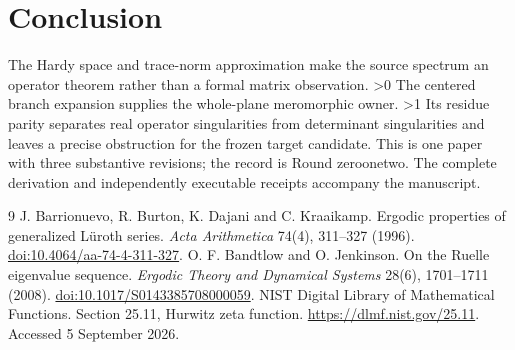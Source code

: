 \documentclass[10pt]{article}
\begin{document}
\section{Conclusion}
The Hardy space and trace-norm approximation make the source spectrum
an operator theorem rather than a formal matrix observation.
\ifnum\CRevisionRound>0
The centered branch expansion supplies the whole-plane meromorphic owner.
\fi
\ifnum\CRevisionRound>1
Its residue parity separates real operator singularities from determinant
singularities and leaves a precise obstruction for the frozen target candidate.
\fi
This is one paper with three substantive revisions; the record is
Round \ifcase\CRevisionRound zero\or one\else two\fi.
The complete derivation and independently executable receipts accompany the manuscript.

\begin{thebibliography}{9}
J. Barrionuevo, R. Burton, K. Dajani and C. Kraaikamp.
Ergodic properties of generalized Lüroth series.
\emph{Acta Arithmetica} 74(4), 311--327 (1996).
\href{https://doi.org/10.4064/aa-74-4-311-327}{doi:10.4064/aa-74-4-311-327}.
O. F. Bandtlow and O. Jenkinson.
On the Ruelle eigenvalue sequence.
\emph{Ergodic Theory and Dynamical Systems} 28(6), 1701--1711 (2008).
\href{https://doi.org/10.1017/S0143385708000059}{doi:10.1017/S0143385708000059}.
NIST Digital Library of Mathematical Functions.
Section 25.11, Hurwitz zeta function.
\url{https://dlmf.nist.gov/25.11}. Accessed 5 September 2026.
\end{thebibliography}
\end{document}
